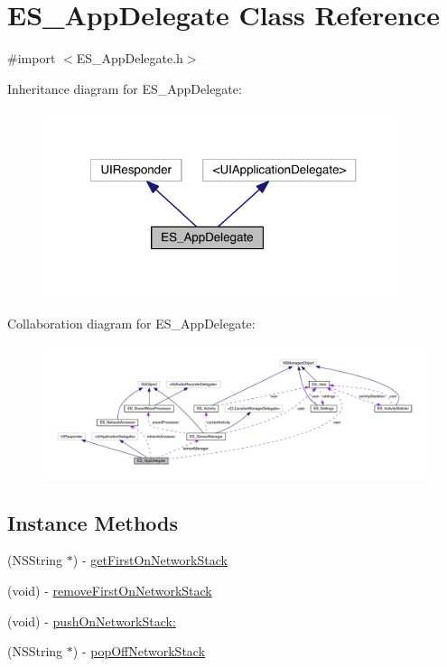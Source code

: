 \hypertarget{interface_e_s___app_delegate}{\section{E\+S\+\_\+\+App\+Delegate Class Reference}
\label{interface_e_s___app_delegate}
}


{\ttfamily \#import $<$E\+S\+\_\+\+App\+Delegate.\+h$>$}



Inheritance diagram for E\+S\+\_\+\+App\+Delegate\+:\nopagebreak
\begin{figure}[H]
\begin{center}
\leavevmode
\includegraphics[width=299pt]{d5/d83/interface_e_s___app_delegate__inherit__graph}
\end{center}
\end{figure}


Collaboration diagram for E\+S\+\_\+\+App\+Delegate\+:\nopagebreak
\begin{figure}[H]
\begin{center}
\leavevmode
\includegraphics[width=350pt]{d6/d6a/interface_e_s___app_delegate__coll__graph}
\end{center}
\end{figure}
\subsection*{Instance Methods}
\begin{DoxyCompactItemize}
\item 
(N\+S\+String $\ast$) -\/ \hyperlink{interface_e_s___app_delegate_ae84b22128913a9c7efc87976e8a60e19}{get\+First\+On\+Network\+Stack}
\item 
(void) -\/ \hyperlink{interface_e_s___app_delegate_ab92706fcdf90191be0d668fd8e455fa9}{remove\+First\+On\+Network\+Stack}
\item 
(void) -\/ \hyperlink{interface_e_s___app_delegate_aadded5728f2ffcfe2ece5931c6968b27}{push\+On\+Network\+Stack\+:}
\item 
(N\+S\+String $\ast$) -\/ \hyperlink{interface_e_s___app_delegate_a5d85b35fb61309b8c66501133566e767}{pop\+Off\+Network\+Stack}
\end{DoxyCompactItemize}
